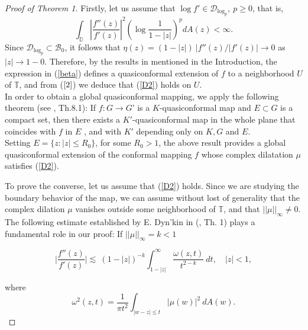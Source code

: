 \documentclass[12pt,a4paper]{article}
\theoremstyle{definition}
\theoremstyle{remark}
\newcommand{\D}{\mathbb{D}}
\newcommand{\T}{\mathbb{T}}
\numberwithin{komcounter}{section}
\begin{document}
\begin{proof}[Proof of Theorem 1]
	
	
	
	
	Firstly, let us assume that $\log{f'}\in \mathcal{D}_{\log_p},~p\geq 0$, that is,$$ \int_{\D}\left\vert\frac{f''(z)}{f'(z)} \right\vert^2 \left(\log \frac{1}{1-|z|}\right)^p dA(z)<\infty.$$ Since  $ \mathcal{D}_{\log_p} \subset \mathcal{B}_0$, it follows that $ \eta(z)=(1-|z|)~ |f''(z)/|f'(z)| \to 0$ as $|z|\to 1-0$. Therefore,   by the results in  \cite{bp} mentioned in the Introduction, the expression in (\ref{beta}) defines a quasiconformal extension of $f$  to a neighborhood $U$ of $\T$, and from ($\ref{2}$) we deduce that  (\ref{D2}) holds on $U$.\\
	In order to obtain a global quasiconformal mapping, we apply the following theorem (see \cite{lv}, Th.8.1):  If $f:G\to G$' is a $K$-quasiconformal map and $E\subset G$  is a compact set, then there exists a  $K'$-quasiconformal  map in the whole plane that coincides with $f$ in  $E$ , and with $K'$ depending only on $ K, G$ and $E$. \\
	Setting $E=\{z:|z|\leq R_0 \}$, for some $R_0>1$, the above result provides a global quasiconformal extension of the conformal mapping $f$ whose complex dilatation $\mu$ satisfies (\ref{D2}).
	
	To prove the converse, let us assume that (\ref{D2}) holds. Since we are studying the boundary behavior of the map, we can assume without lost of generality that the complex dilation $\mu$ vanishes outside some neighborhood of $\T$, and that  $||\mu||_\infty\neq 0$.\\
	The following  estimate  established by E. Dyn'kin in (\cite{d}, Th. 1) plays a fundamental role in our proof: If $||\mu||_\infty=k<1$
	
	\begin{equation}\label{dyn}
	\bigg\vert\frac{f''(z)}{f'(z)}\bigg\vert \lesssim~ (1-|z|)^{-k} \int_{1-|z|}^{\infty}
	\frac{\omega(z,t)}{t^{2-k}}~ dt, \quad |z| < 1,
	\end{equation}
	
	where
	$$
	\omega^2(z, t) = \frac{1}{\pi t^2}  \int_{|w-z|\leq t} |\mu(w)|^2 ~dA(w).
	$$	
	

\end{proof}
\end{document}
